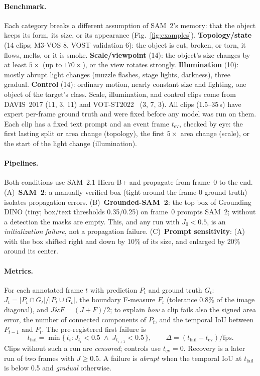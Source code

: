 \documentclass[11pt,a4paper]{article}
\newcommand{\sam}{SAM~2}
\newcommand{\gdsam}{Grounded-SAM~2}
\begin{document}
\paragraph{Benchmark.}
Each category breaks a different assumption of \sam{}'s memory: that the
object keeps its form, its size, or its appearance (Fig.~\ref{fig:examples}).
\textbf{Topology/state} (14 clips; M3-VOS 8, VOST validation 6): the object is
cut, broken, or torn, it flows, melts, or it is smoke.
\textbf{Scale/viewpoint} (14): the object's size changes by at least $5\times$
(up to $170\times$), or the view rotates strongly. \textbf{Illumination} (10):
mostly abrupt light changes (muzzle flashes, stage lights, darkness), three
gradual. \textbf{Control} (14): ordinary motion, nearly constant size and
lighting, one object of the target's class. Scale, illumination, and control
clips come from DAVIS~2017 (11, 3, 11) and VOT-ST2022~\cite{kristan2022vot}
(3, 7, 3). All clips (1.5--35\,s) have expert per-frame ground truth and were
fixed before any model was run on them. Each
clip has a fixed text prompt and an event frame $t_{\mathrm{ev}}$, checked by
eye: the first lasting split or area change (topology), the first $5\times$
area change (scale), or the start of the light change (illumination).

\paragraph{Pipelines.}
Both conditions use \sam{}.1 Hiera-B+ and propagate from frame~0 to the end.
(A)~\textbf{\sam{}}: a manually verified box (tight around the frame-0
ground truth) isolates propagation errors. (B)~\textbf{\gdsam{}}: the top box of Grounding DINO (tiny; box/text
thresholds 0.35/0.25) on frame~0 prompts \sam{}; without a detection the
masks are empty. This, and any run with $J_0<0.5$, is an
\emph{initialization failure}, not a propagation failure.
(C)~\textbf{Prompt sensitivity}: (A) with the box shifted right and down by
10\% of its size, and enlarged by 20\% around its center.

\paragraph{Metrics.}
For each annotated frame $t$ with prediction $P_t$ and ground truth $G_t$:
$J_t=|P_t\cap G_t|/|P_t\cup G_t|$, the boundary F-measure $F_t$ (tolerance
0.8\% of the image diagonal), and $J\&F=(J+F)/2$; to explain \emph{how} a clip
fails also the signed area error, the number of connected components of
$P_t$, and the temporal IoU between $P_{t-1}$ and $P_t$. The pre-registered
first failure is
\begin{equation}
    t_{\mathrm{fail}}=\min\{\,t_i : J_{t_i}<0.5 \;\wedge\; J_{t_{i+1}}<0.5\,\},
    \qquad \Delta=(t_{\mathrm{fail}}-t_{\mathrm{ev}})/\mathrm{fps}.
\end{equation}
Clips without such a run are \emph{censored}; controls use $t_{\mathrm{ev}}=0$.
Recovery is a later run of two frames with $J\ge0.5$. A failure is
\emph{abrupt} when the temporal IoU at $t_{\mathrm{fail}}$ is below 0.5 and
\emph{gradual} otherwise.
\end{document}
